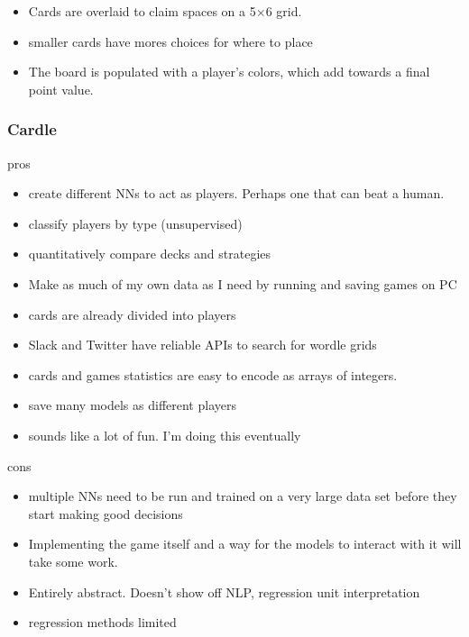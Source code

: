 \documentclass[aspectratio=169,12pt]{beamer}
\begin{document}
\begin{frame}
	\begin{itemize}
		\item Cards are overlaid to claim spaces on a 5$\times$6 grid.
		\item smaller cards have mores choices for where to place
		\item The board is populated with a player's colors, which add towards a final point value.
	\end{itemize}
\end{frame}

\begin{frame}\frametitle{Cardle}
	\begin{block}{pros}
		\begin{itemize}
			\small
			\item create different NNs to act as players. Perhaps one that can beat a human.
			\item classify players by type (unsupervised)
			\item quantitatively compare decks and strategies
			\item Make as much of my own data as I need by running and saving games on PC
			\item cards are already divided into players
			\item Slack and Twitter have reliable APIs to search for wordle grids
			\item cards and games statistics are easy to encode as arrays of integers.
			\item save many models as different players
			\item sounds like a lot of fun. I'm doing this eventually
		\end{itemize}
	\end{block}
	\begin{alertblock}{cons}
		\begin{itemize}
		\item 			\scriptsize{multiple NNs need to be run and trained on a very large data set before they start making good decisions}
		\item Implementing the game itself and a way for the models to interact with it will take some work.
		\item Entirely abstract. Doesn't show off NLP, regression unit interpretation
		\item regression methods limited
		\end{itemize}
	\end{alertblock}
\end{frame}
\end{document}
